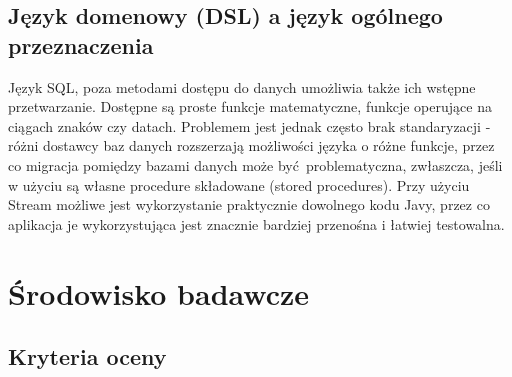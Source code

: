 \documentclass[12pt]{extarticle}
\begin{document}
\subsection{Język domenowy (DSL) a język ogólnego przeznaczenia}

    Język SQL, poza metodami dostępu do danych umożliwia także ich wstępne przetwarzanie. Dostępne są proste funkcje matematyczne, funkcje operujące na ciągach znaków czy datach. Problemem jest jednak często brak standaryzacji - różni dostawcy baz danych rozszerzają możliwości języka o różne funkcje, przez co migracja pomiędzy bazami danych może być problematyczna, zwłaszcza, jeśli w użyciu są własne procedure składowane (stored procedures). Przy użyciu Stream możliwe jest wykorzystanie praktycznie dowolnego kodu Javy, przez co aplikacja je wykorzystująca jest znacznie bardziej przenośna i łatwiej testowalna.
    

\section{Środowisko badawcze}

\subsection{Kryteria oceny}
\end{document}
